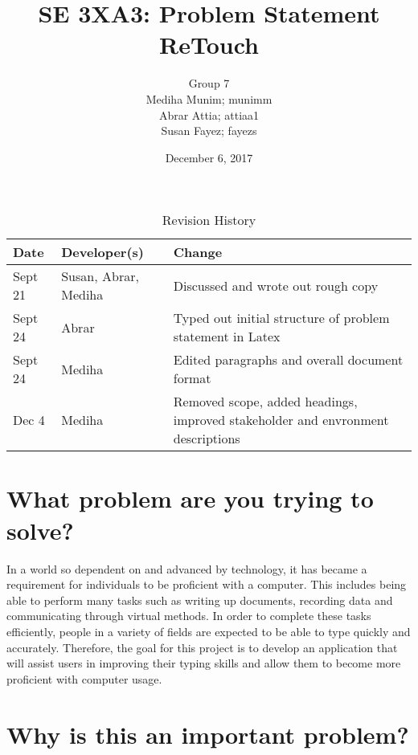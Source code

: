 \documentclass[12pt, oneside]{article}
\title{SE 3XA3: Problem Statement\\ReTouch}
\author{Group 7
		\\ Mediha Munim; munimm
		\\ Abrar Attia; attiaa1
		\\ Susan Fayez; fayezs}
\date{December 6, 2017}
\begin{document}
\begin{table}[!h]
\caption{Revision History} \label{TblRevisionHistory}
\begin{tabularx}{\textwidth}{llX}
\toprule
\textbf{Date} & \textbf{Developer(s)} & \textbf{Change}\\
\midrule
Sept 21 & Susan, Abrar, Mediha & Discussed and wrote out rough copy\\
Sept 24 & Abrar & Typed out initial structure of problem statement in Latex\\
Sept 24 & Mediha & Edited paragraphs and overall document format \\
Dec 4 & Mediha & Removed scope, added headings, improved stakeholder and envronment descriptions\\
\bottomrule
\end{tabularx}
\end{table}

\newpage
\maketitle


\color{cyan}
\section{What problem are you trying to solve?}
\color{black}

In a world so dependent on and advanced by technology, it has became a requirement for individuals to be proficient with a computer. This includes being able to perform many tasks such as writing up documents, recording data and communicating through virtual methods. In order to complete these tasks efficiently, people in a variety of fields are expected to be able to type quickly and accurately. Therefore, the goal for this project is to develop an application that will assist users in improving their typing skills and allow them to become more proficient with computer usage. 
\\
\color{cyan}
\section{Why is this an important problem?}
\color{black}
\end{document}
